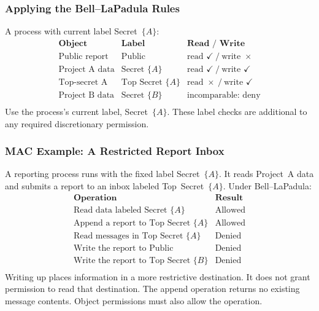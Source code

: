 \documentclass[hidelinks]{article}
\begin{document}
\subsubsection{Applying the Bell--LaPadula Rules}

A process with current label Secret~$\{A\}$:
\[
\begin{array}{lll}
\textbf{Object} & \textbf{Label} & \textbf{Read / Write}\\ \hline
\text{Public report} & \text{Public}            & \text{read }\checkmark\ /\ \text{write }\times\\
\text{Project A data} & \text{Secret } \{A\}     & \text{read }\checkmark\ /\ \text{write }\checkmark\\
\text{Top-secret A}   & \text{Top Secret } \{A\} & \text{read }\times\ /\ \text{write }\checkmark\\
\text{Project B data} & \text{Secret } \{B\}     & \text{incomparable: deny}\\
\end{array}
\]
Use the process's current label, Secret~$\{A\}$. These label checks are additional to any required discretionary permission.

\subsubsection{MAC Example: A Restricted Report Inbox}

A reporting process runs with the fixed label Secret~$\{A\}$. It reads Project~A data and submits a report to an inbox labeled Top~Secret~$\{A\}$. Under Bell--LaPadula:
\[
\begin{array}{ll}
\textbf{Operation} & \textbf{Result}\\ \hline
\text{Read data labeled Secret } \{A\}  & \text{Allowed}\\
\text{Append a report to Top Secret } \{A\} & \text{Allowed}\\
\text{Read messages in Top Secret } \{A\}   & \text{Denied}\\
\text{Write the report to Public}           & \text{Denied}\\
\text{Write the report to Top Secret } \{B\} & \text{Denied}\\
\end{array}
\]
Writing up places information in a more restrictive destination. It does not grant permission to read that destination. The append operation returns no existing message contents. Object permissions must also allow the operation.
\end{document}
